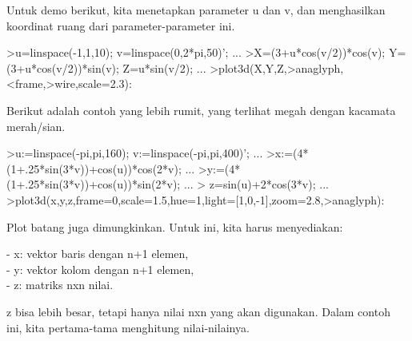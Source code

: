 \documentclass[a4paper,10pt]{article}
\begin{document}
\begin{eulernotebook}
\begin{eulercomment}
\begin{eulercomment}
\begin{eulercomment}
Untuk demo berikut, kita menetapkan parameter u dan v, dan
menghasilkan koordinat ruang dari parameter-parameter ini.
\end{eulercomment}
\begin{eulerprompt}
>u=linspace(-1,1,10); v=linspace(0,2*pi,50)'; ...
>X=(3+u*cos(v/2))*cos(v); Y=(3+u*cos(v/2))*sin(v); Z=u*sin(v/2); ...
>plot3d(X,Y,Z,>anaglyph,<frame,>wire,scale=2.3):
\end{eulerprompt}
\begin{eulercomment}
Berikut adalah contoh yang lebih rumit, yang terlihat megah dengan
kacamata merah/sian.
\end{eulercomment}
\begin{eulerprompt}
>u:=linspace(-pi,pi,160); v:=linspace(-pi,pi,400)';  ...
>x:=(4*(1+.25*sin(3*v))+cos(u))*cos(2*v); ...
>y:=(4*(1+.25*sin(3*v))+cos(u))*sin(2*v); ...
> z=sin(u)+2*cos(3*v); ...
>plot3d(x,y,z,frame=0,scale=1.5,hue=1,light=[1,0,-1],zoom=2.8,>anaglyph):
\end{eulerprompt}
\begin{eulercomment}
Plot batang juga dimungkinkan. Untuk ini, kita harus menyediakan:

- x: vektor baris dengan n+1 elemen,\\
- y: vektor kolom dengan n+1 elemen,\\
- z: matriks nxn nilai.

z bisa lebih besar, tetapi hanya nilai nxn yang akan digunakan. Dalam
contoh ini, kita pertama-tama menghitung nilai-nilainya.


\end{eulercomment}
\end{eulercomment}
\end{eulercomment}
\end{eulernotebook}
\end{document}
